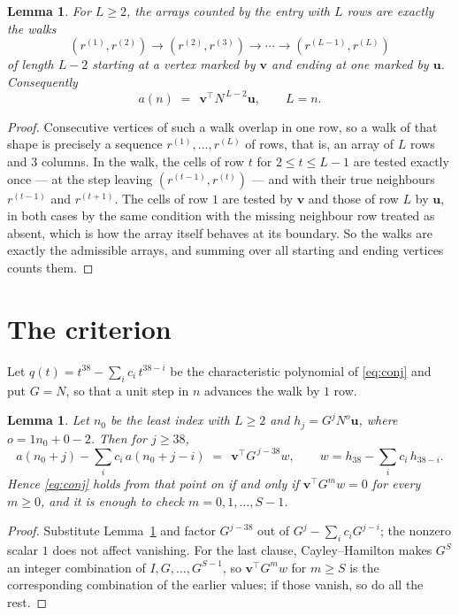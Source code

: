 \documentclass[11pt,a4paper]{article}
\theoremstyle{plain}
\newtheorem{lemma}[theorem]{Lemma}
\theoremstyle{definition}
\begin{document}
\begin{lemma}\label{lem:walk}
For $L\ge2$, the arrays counted by the entry with $L$ rows are exactly the walks
\[
(r^{(1)},r^{(2)})\to(r^{(2)},r^{(3)})\to\cdots\to(r^{(L-1)},r^{(L)})
\]
of length $L-2$ starting at a vertex marked by $\mathbf{v}$ and ending at one marked by
$\mathbf{u}$. Consequently
\[
a(n)\;=\;\,\mathbf{v}^{\!\top}N^{\,L-2}\mathbf{u},\qquad L=n .
\]
\end{lemma}

\begin{proof}
Consecutive vertices of such a walk overlap in one row, so a walk of that shape is
precisely a sequence $r^{(1)},\dots,r^{(L)}$ of rows, that is, an array of $L$ rows
and $3$ columns. In the walk, the cells of row $t$ for $2\le t\le L-1$ are tested
exactly once --- at the step leaving $(r^{(t-1)},r^{(t)})$ --- and with their true
neighbours $r^{(t-1)}$ and $r^{(t+1)}$. The cells of row $1$ are tested by
$\mathbf{v}$ and those of row $L$ by $\mathbf{u}$, in both cases by the same condition
with the missing neighbour row treated as absent, which is how the array itself behaves at
its boundary. So the walks are exactly the admissible arrays, and summing over all starting
and ending vertices counts them.
\end{proof}

\section{The criterion}

Let $q(t)=t^{38}-\sum_i c_i\,t^{38-i}$ be the characteristic polynomial of
\eqref{eq:conj} and put $G=N$, so that a unit step in $n$ advances the walk by
$1$ row.

\begin{lemma}\label{lem:crit}
Let $n_0$ be the least index with $L\ge2$ and $h_j=G^{j}N^{o}\mathbf{u}$, where
$o=1n_0+0-2$. Then for $j\ge38$,
\[
a(n_0+j)-\sum_i c_i\,a(n_0+j-i)\;=\;\,\mathbf{v}^{\!\top}G^{\,j-38}w,
\qquad w=h_{38}-\sum_i c_i\,h_{38-i} .
\]
Hence \eqref{eq:conj} holds from that point on if and only if
$\mathbf{v}^{\!\top}G^{m}w=0$ for every $m\ge0$, and it is enough to check
$m=0,1,\dots,S-1$.
\end{lemma}

\begin{proof}
Substitute Lemma~\ref{lem:walk} and factor $G^{j-38}$ out of
$G^{j}-\sum_ic_iG^{j-i}$; the nonzero scalar $1$ does not affect
vanishing. For the last clause, Cayley--Hamilton makes $G^{S}$ an integer combination of
$I,G,\dots,G^{S-1}$, so $\mathbf{v}^{\!\top}G^{m}w$ for $m\ge S$ is the corresponding
combination of the earlier values; if those vanish, so do all the rest.
\end{proof}
\end{document}
